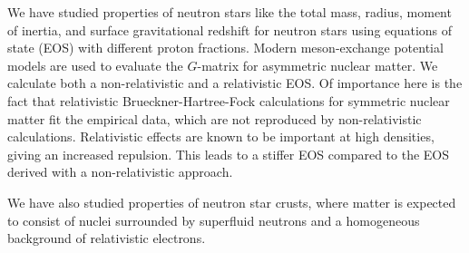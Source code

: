 We have studied properties of neutron
stars like
the total mass, radius, moment of inertia, and
surface gravitational redshift  for neutron
stars using equations of state (EOS) with different proton fractions.
Modern meson-exchange potential models are used to
evaluate the $G$-matrix for asymmetric nuclear matter.
We calculate both a non-relativistic and a relativistic EOS.
Of importance here is the fact that relativistic Brueckner-Hartree-Fock
calculations for symmetric nuclear matter fit the empirical data, which
are not reproduced by non-relativistic calculations.
Relativistic  effects are known to be important at high densities, 
giving an increased repulsion. This leads  to a stiffer EOS
compared to the EOS derived with a non-relativistic approach.

We have also studied
properties of neutron star crusts, where
matter is expected to consist of 
nuclei surrounded by superfluid 
neutrons and a homogeneous background of relativistic electrons. 

